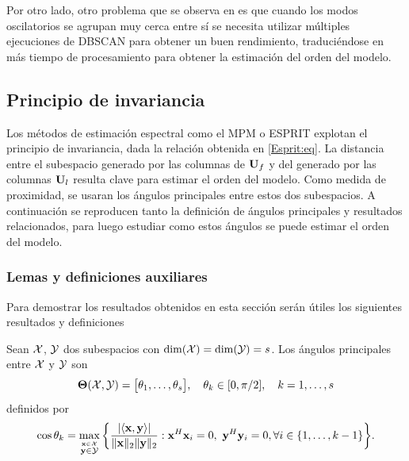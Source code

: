 		Por otro lado, otro problema que se observa en \cite{BRIANI2020} es que cuando los modos oscilatorios se agrupan muy cerca entre sí se necesita utilizar múltiples ejecuciones de DBSCAN para obtener un buen rendimiento, traduciéndose en más tiempo de procesamiento para obtener la estimación del orden del modelo.
			
\subsection{Principio de invariancia}	

Los métodos de estimación espectral como el MPM o ESPRIT explotan el principio de invariancia, dada la relación obtenida en \eqref{Esprit:eq}.  La distancia entre el subespacio generado por las columnas de $\mathbf{U}_{f}$  y del generado por las columnas $\mathbf{U}_l$ resulta clave para estimar el orden del modelo. Como medida de proximidad, se usaran los ángulos principales entre estos dos subespacios. A continuación se reproducen tanto la definición de ángulos principales y resultados relacionados, para luego estudiar como estos ángulos se puede estimar el orden del modelo.
\subsubsection{Lemas y definiciones auxiliares}

 Para demostrar los resultados obtenidos en esta sección serán útiles los siguientes resultados y definiciones 

\begin{definition}\label{def:principalAngles}
	Sean $\mathcal{X}$, $\mathcal{Y}$ dos subespacios con $\dim(\mathcal{X}) = \dim(\mathcal{Y})=s$. Los ángulos principales entre $\mathcal{X}$ y $\mathcal{Y}$ son
	\begin{equation*}
		\boldsymbol{\Theta}(\mathcal{X},\mathcal{Y}) = \big[\theta_1, \ldots, \theta_s\big],\quad \theta_k\in[0,\pi/2],\quad k=1,\ldots,s
	\end{equation*}
	definidos por
	\begin{equation}
		\cos\theta_k = \max_{\stackrel{\mathbf{x}\in\mathcal{X}}{\mathbf{y}\in\mathcal{Y}}}\bigg\{\frac{|\langle\mathbf{x},\mathbf{y}\rangle|}{\|\mathbf{x}\|_2\|\mathbf{y}\|_2} : \mathbf{x}^H\mathbf{x}_i = 0,\ \mathbf{y}^H\mathbf{y}_i = 0,  \forall i\in\{1,\ldots,k-1\}\bigg\}.
		\label{Eq:principalAngles2}
	\end{equation}
\end{definition}

